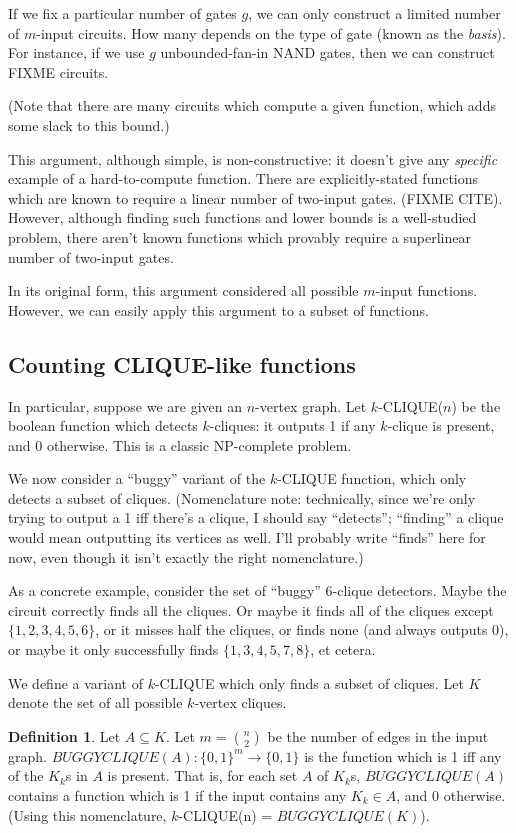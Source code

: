 \documentclass[12pt]{article}
\theoremstyle{definition}
\newtheorem{defn}{Definition}[section]
\begin{document}
If we fix a particular number of gates $g$, we can only construct a limited
number of $m$-input circuits. How many depends on the type of gate (known as
the {\em basis}).  For instance,
if we use $g$ unbounded-fan-in NAND gates, then we can construct FIXME circuits.

(Note that there are many circuits which compute a given function,
which adds some slack to this bound.)

This argument, although simple, is non-constructive: it doesn't give any
{\em specific} example of a hard-to-compute function.
There are explicitly-stated functions which are known to require
a linear number of two-input gates.
(FIXME CITE). However, although finding such functions and lower bounds is
a well-studied problem, there aren't known functions which provably require
a superlinear number of two-input gates.

In its original form, this argument considered all possible $m$-input functions.
However, we can easily apply this argument to a subset of functions.

\subsection{Counting CLIQUE-like functions}

In particular, suppose we are given an $n$-vertex graph.
Let $k$-CLIQUE($n$) be the boolean function which
detects $k$-cliques: it outputs 1 if any $k$-clique
is present, and 0 otherwise. This is a classic
NP-complete problem.

We now consider a ``buggy'' variant of the $k$-CLIQUE function,
which only detects a subset of cliques. (Nomenclature note:
technically, since
we're only trying to output a 1 iff there's a clique, I should say
``detects''; ``finding'' a clique would mean outputting its
vertices as well. I'll probably write ``finds'' here for now,
even though it isn't exactly the right nomenclature.)

As a concrete example,
consider the set of ``buggy'' 6-clique detectors.
Maybe the circuit correctly
finds all the cliques. Or maybe it finds all of the cliques except $\{1,2,3,4,5,6\}$,
or it misses half the cliques, or finds none (and always outputs 0), or maybe
it only successfully finds $\{1,3,4,5,7,8\}$, et cetera.

We define a variant of $k$-CLIQUE which only
finds a subset of cliques.
Let $K$ denote the set of all possible
$k$-vertex cliques.

\begin{defn}
\label{BUGGYCLIQUE}
Let $A \subseteq K$.
Let $m = {n \choose 2}$ be the number of edges in the input graph.
$BUGGYCLIQUE(A): \{0,1\}^m \rightarrow \{0,1\}$ is the function which
is 1 iff any of the $K_k$s in $A$ is present.
That is, for each set $A$ of $K_k$s, $BUGGYCLIQUE(A)$
contains a function which is 1 if the input contains any $K_k \in A$,
and 0 otherwise. (Using this nomenclature,
$k$-CLIQUE(n) = $BUGGYCLIQUE(K)$).
\end{defn}
\end{document}

